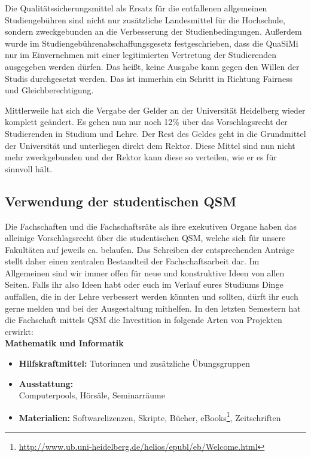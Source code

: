 Die Qualitätssicherungsmittel als Ersatz für die entfallenen allgemeinen Studiengebühren sind nicht nur zusätzliche Landesmittel für die Hochschule, sondern zweckgebunden an die Verbesserung der Studienbedingungen. Außerdem wurde im Studien\-gebühren\-abschaffungs\-gesetz festgeschrieben, dass die QuaSiMi nur im Einvernehmen mit einer legitimierten Vertretung der Studierenden ausgegeben werden dürfen. Das heißt, keine Ausgabe kann gegen den Willen der Studis durchgesetzt werden. Das ist immerhin ein Schritt in Richtung Fairness und Gleichberechtigung.

Mittlerweile hat sich die Vergabe der Gelder an der Universität Heidelberg wieder komplett geändert. Es gehen nun nur noch 12\% über das Vorschlagsrecht der Studierenden in Studium und Lehre. Der Rest des Geldes geht in die Grundmittel der Universität und unterliegen direkt dem Rektor. Diese Mittel sind nun nicht mehr zweckgebunden und der Rektor kann diese so verteilen, wie er es für sinnvoll hält. 

\subsection{Verwendung der studentischen QSM}
Die Fachschaften und die Fachschaftsräte als ihre exekutiven Organe haben das alleinige Vorschlagsrecht über die studentischen QSM, welche sich für unsere Fakultäten auf jeweils ca.  belaufen. Das Schreiben der entsprechenden Anträge stellt daher einen zentralen Bestandteil der Fachschaftsarbeit dar. Im Allgemeinen sind wir immer offen für neue und konstruktive Ideen von allen Seiten. Falls ihr also Ideen habt oder euch im Verlauf eures Studiums Dinge auffallen, die in der Lehre verbessert werden könnten und sollten, dürft ihr euch gerne melden und bei der Ausgestaltung mithelfen. In den letzten Semestern hat die Fachschaft mittels QSM die Investition in folgende Arten von Projekten erwirkt:\\

\noindent\textbf{Mathematik und Informatik}
\begin{itemize}
\item \textbf{Hilfskraftmittel:} Tutorinnen und zusätzliche Übungsgruppen
\item \textbf{Ausstattung:}\\ Computerpools, Hörsäle, Seminarräume
\item \textbf{Materialien:} Softwarelizenzen, Skripte, Bücher, eBooks\footnote{\url{http://www.ub.uni-heidelberg.de/helios/epubl/eb/Welcome.html}}, Zeitschriften
\end{itemize}

